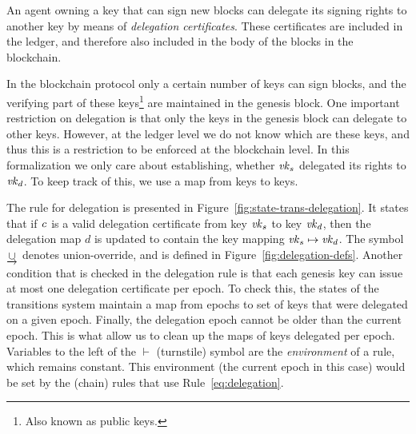 \newcommand{\DCert}{\type{DCert}}
\newcommand{\DState}{\type{DState}}

An agent owning a key that can sign new blocks can delegate its signing rights
to another key by means of \textit{delegation certificates}. These certificates
are included in the ledger, and therefore also included in the body of the
blocks in the blockchain.

In the blockchain protocol only a certain number of keys can sign blocks, and
the verifying part of these keys\footnote{Also known as public keys.} are
maintained in the genesis block. One important restriction on delegation is
that only the keys in the genesis block can delegate to other keys. However, at
the ledger level we do not know which are these keys, and thus this is a
restriction to be enforced at the blockchain level. In this formalization we
only care about establishing, whether $\mathit{vk}_s$ delegated its rights to
$\mathit{vk}_d$. To keep track of this, we use a map from keys to keys.

The rule for delegation is presented in
Figure~\ref{fig:state-trans-delegation}. It states that if $\mathit{c}$ is a valid
delegation certificate from key $\mathit{vk}_s$ to key $\mathit{vk}_d$, then the
delegation map $d$ is updated to contain the key mapping
$\mathit{vk}_s \mapsto \mathit{vk}_d$. The symbol $\mathbin{\underrightarrow\cup}$ denotes
union-override, and is defined in Figure~\ref{fig:delegation-defs}. Another
condition that is checked in the delegation rule is that each genesis key can
issue at most one delegation certificate per epoch. To check this, the states
of the transitions system maintain a map from epochs to set of keys that were
delegated on a given epoch. Finally, the delegation epoch cannot be older than
the current epoch. This is what allow us to clean up the maps of keys delegated
per epoch. Variables to the left of the $\vdash$ (turnstile) symbol are the
\textit{environment} of a rule, which remains constant. This environment (the
current epoch in this case) would be set by the (chain) rules that use
Rule~\ref{eq:delegation}.

